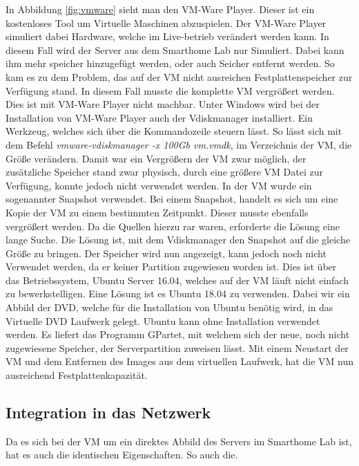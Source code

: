  In Abbildung \ref{fig:vmware} sieht man den VM-Ware Player. Dieser ist ein kostenloses Tool um Virtuelle Maschinen abzuspielen. Der VM-Ware Player simuliert dabei Hardware, welche im Live-betrieb verändert werden kann. \autocite{vmwareinc.2018} In diesem Fall wird der Server aus dem Smarthome Lab nur Simuliert. Dabei kann ihm mehr speicher hinzugefügt werden, oder auch Seicher entfernt werden. So kam es zu dem Problem, das auf der \ac{VM} nicht ausreichen Festplattenspeicher zur Verfügung stand. In diesem Fall musste die komplette \ac{VM} vergrößert werden. Dies ist mit VM-Ware Player nicht machbar. Unter Windows wird bei der Installation von VM-Ware Player auch der Vdiskmanager installiert. Ein Werkzeug, welches sich über die Kommandozeile steuern lässt. So lässt sich mit dem Befehl \textit{vmware-vdiskmanager -x 100Gb vm.vmdk}, im Verzeichnis der \ac{VM}, die Größe verändern. \autocite{ThomasKrennAG.2018} Damit war ein Vergrößern der \ac{VM} zwar möglich, der zusätzliche Speicher stand zwar physisch, durch eine größere \ac{VM} Datei zur Verfügung, konnte jedoch nicht verwendet werden. In der \ac{VM} wurde ein sogenannter Snapshot verwendet. Bei einem Snapshot, handelt es sich um eine Kopie der \ac{VM} zu einem bestimmten Zeitpunkt. Dieser musste ebenfalls vergrößert werden. Da die Quellen hierzu rar waren, erforderte die Lösung eine lange Suche. Die Lösung ist, mit dem Vdiskmanager den Snapshot auf die gleiche Größe zu bringen. Der Speicher wird nun angezeigt, kann jedoch noch nicht Verwendet werden, da er keiner Partition zugewiesen worden ist. Dies ist über das Betriebssystem, Ubuntu Server 16.04, welches auf der \ac{VM} läuft nicht einfach zu bewerkstelligen. Eine Lösung ist es Ubuntu 18.04 zu verwenden. Dabei wir ein Abbild der DVD, welche für die Installation von Ubuntu benötig wird, in das Virtuelle DVD Laufwerk gelegt. Ubuntu kann ohne Installation verwendet werden. Es liefert das Programm GPartet, mit welchem sich der neue, noch nicht zugewiesene Speicher, der Serverpartition zuweisen lässt. Mit einem Neustart der \ac{VM} und dem Entfernen des Images aus dem virtuellen Laufwerk, hat die \ac{VM} nun ausreichend Festplattenkapazität.\autocite{automatix.}

\subsection{Integration in das Netzwerk}
Da es sich bei der \ac{VM} um ein direktes Abbild des Servers im Smarthome Lab ist, hat es auch die identischen Eigenschaften. So auch die. 

